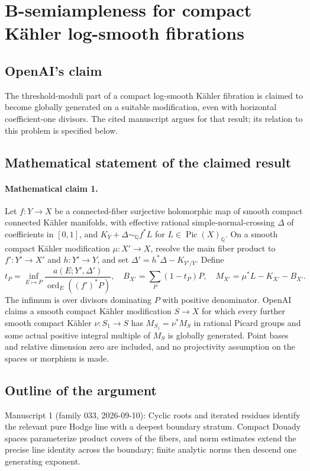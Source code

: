 \documentclass[11pt]{article}
\begin{document}
\section*{B-semiampleness for compact Kähler log-smooth fibrations}

\subsection{OpenAI's claim}
The threshold-moduli part of a compact log-smooth Kähler fibration is claimed to become globally generated on a suitable modification, even with horizontal coefficient-one divisors. The cited manuscript argues for that result; its relation to this problem is specified below.

\subsection{Mathematical statement of the claimed result}
\paragraph{Mathematical claim 1.} Let $f:Y\to X$ be a connected-fiber surjective holomorphic map of smooth compact connected Kähler manifolds, with effective rational simple-normal-crossing $\Delta$ of coefficients in $[0,1]$, and $K_Y+\Delta\sim_{\mathbb Q}f^*L$ for $L\in\operatorname{Pic}(X)_{\mathbb Q}$. On a smooth compact Kähler modification $\mu:X'\to X$, resolve the main fiber product to $f':Y'\to X'$ and $h:Y'\to Y$, and set $\Delta'=h^*\Delta-K_{Y'/Y}$. Define
\[
t_P=\inf_{E\mapsto P}\frac{a(E;Y',\Delta')}{\operatorname{ord}_E((f')^*P)},\quad
B_{X'}=\sum_P(1-t_P)P,\quad M_{X'}=\mu^*L-K_{X'}-B_{X'}.
\]
The infimum is over divisors dominating $P$ with positive denominator. OpenAI claims a smooth compact Kähler modification $S\to X$ for which every further smooth compact Kähler $\nu:S_1\to S$ has $M_{S_1}=\nu^*M_S$ in rational Picard groups and some actual positive integral multiple of $M_S$ is globally generated. Point bases and relative dimension zero are included, and no projectivity assumption on the spaces or morphism is made.

\subsection{Outline of the argument}
Manuscript 1 (family 033, 2026-09-10): Cyclic roots and iterated residues identify the relevant pure Hodge line with a deepest boundary stratum. Compact Douady spaces parameterize product covers of the fibers, and norm estimates extend the precise line identity across the boundary; finite analytic norms then descend one generating exponent.
\end{document}
